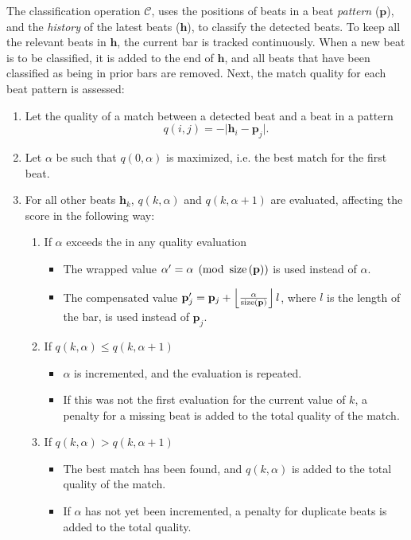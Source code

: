 The classification operation $\mathcal{C}$,
uses the positions of beats in a beat \textit{pattern} ($\mathbf{p}$),
and the \textit{history} of the latest beats ($\mathbf{h}$),
to classify the detected beats.
To keep all the relevant beats in $\mathbf{h}$,
the current bar is tracked continuously.
When a new beat is to be classified,
it is added to the end of $\mathbf{h}$,
and all beats that have been classified
as being in prior bars are removed.
Next, the match quality for each beat pattern is assessed:
\begin{enumerate}
\item Let the quality of a match between a detected beat
and a beat in a pattern
\begin{equation}
q(i, j) = -\vert \mathbf{h}_i - \mathbf{p}_j \vert.
\end{equation}

\item Let $\alpha$ be such that $q(0, \alpha)$ is maximized,
i.e. the best match for the first beat.

\item For all other beats $\mathbf{h}_k$,
$q(k, \alpha)$ and $q(k, \alpha + 1)$ are evaluated,
affecting the score in the following way:
\begin{enumerate}
\item If $\alpha$ exceeds the  in any quality evaluation
\begin{itemize}
\item The wrapped value $\alpha' = \alpha \pmod {\operatorname{size} \left( \mathbf{p} \right)}$ is used instead of $\alpha$.
\item The compensated value
$\mathbf{p}_j' = \mathbf{p}_j +
\left \lfloor
\frac{\alpha}{\operatorname{size} \left( \mathbf{p} \right)}
\right \rfloor l$,
where $l$ is the length of the bar,
is used instead of $\mathbf{p}_j$.
\end{itemize}

\item If $q(k, \alpha) \leq q(k, \alpha + 1)$
\begin{itemize}
\item $\alpha$ is incremented, and the evaluation is repeated.
\item If this was not the first evaluation for the current value of $k$,
a penalty for a missing beat is added to the total quality of the match.
\end{itemize}

\item If $q(k, \alpha) > q(k, \alpha + 1)$
\begin{itemize}
\item The best match has been found,
and $q(k, \alpha)$ is added to the total quality of the match.
\item If $\alpha$ has not yet been incremented,
a penalty for duplicate beats is added to the total quality.
\end{itemize}
\end{enumerate}
\end{enumerate}

